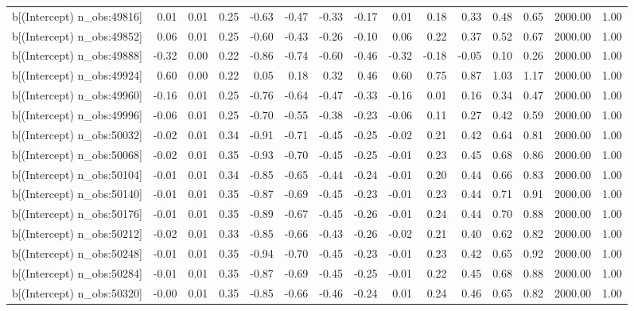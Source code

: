 \begin{table}[ht]
\begin{tabular}{rrrrrrrrrrrrrrr}
  b[(Intercept) n\_obs:49816] & 0.01 & 0.01 & 0.25 & -0.63 & -0.47 & -0.33 & -0.17 & 0.01 & 0.18 & 0.33 & 0.48 & 0.65 & 2000.00 & 1.00 \\ 
  b[(Intercept) n\_obs:49852] & 0.06 & 0.01 & 0.25 & -0.60 & -0.43 & -0.26 & -0.10 & 0.06 & 0.22 & 0.37 & 0.52 & 0.67 & 2000.00 & 1.00 \\ 
  b[(Intercept) n\_obs:49888] & -0.32 & 0.00 & 0.22 & -0.86 & -0.74 & -0.60 & -0.46 & -0.32 & -0.18 & -0.05 & 0.10 & 0.26 & 2000.00 & 1.00 \\ 
  b[(Intercept) n\_obs:49924] & 0.60 & 0.00 & 0.22 & 0.05 & 0.18 & 0.32 & 0.46 & 0.60 & 0.75 & 0.87 & 1.03 & 1.17 & 2000.00 & 1.00 \\ 
  b[(Intercept) n\_obs:49960] & -0.16 & 0.01 & 0.25 & -0.76 & -0.64 & -0.47 & -0.33 & -0.16 & 0.01 & 0.16 & 0.34 & 0.47 & 2000.00 & 1.00 \\ 
  b[(Intercept) n\_obs:49996] & -0.06 & 0.01 & 0.25 & -0.70 & -0.55 & -0.38 & -0.23 & -0.06 & 0.11 & 0.27 & 0.42 & 0.59 & 2000.00 & 1.00 \\ 
  b[(Intercept) n\_obs:50032] & -0.02 & 0.01 & 0.34 & -0.91 & -0.71 & -0.45 & -0.25 & -0.02 & 0.21 & 0.42 & 0.64 & 0.81 & 2000.00 & 1.00 \\ 
  b[(Intercept) n\_obs:50068] & -0.02 & 0.01 & 0.35 & -0.93 & -0.70 & -0.45 & -0.25 & -0.01 & 0.23 & 0.45 & 0.68 & 0.86 & 2000.00 & 1.00 \\ 
  b[(Intercept) n\_obs:50104] & -0.01 & 0.01 & 0.34 & -0.85 & -0.65 & -0.44 & -0.24 & -0.01 & 0.20 & 0.44 & 0.66 & 0.83 & 2000.00 & 1.00 \\ 
  b[(Intercept) n\_obs:50140] & -0.01 & 0.01 & 0.35 & -0.87 & -0.69 & -0.45 & -0.23 & -0.01 & 0.23 & 0.44 & 0.71 & 0.91 & 2000.00 & 1.00 \\ 
  b[(Intercept) n\_obs:50176] & -0.01 & 0.01 & 0.35 & -0.89 & -0.67 & -0.45 & -0.26 & -0.01 & 0.24 & 0.44 & 0.70 & 0.88 & 2000.00 & 1.00 \\ 
  b[(Intercept) n\_obs:50212] & -0.02 & 0.01 & 0.33 & -0.85 & -0.66 & -0.43 & -0.26 & -0.02 & 0.21 & 0.40 & 0.62 & 0.82 & 2000.00 & 1.00 \\ 
  b[(Intercept) n\_obs:50248] & -0.01 & 0.01 & 0.35 & -0.94 & -0.70 & -0.45 & -0.23 & -0.01 & 0.23 & 0.42 & 0.65 & 0.92 & 2000.00 & 1.00 \\ 
  b[(Intercept) n\_obs:50284] & -0.01 & 0.01 & 0.35 & -0.87 & -0.69 & -0.45 & -0.25 & -0.01 & 0.22 & 0.45 & 0.68 & 0.88 & 2000.00 & 1.00 \\ 
  b[(Intercept) n\_obs:50320] & -0.00 & 0.01 & 0.35 & -0.85 & -0.66 & -0.46 & -0.24 & 0.01 & 0.24 & 0.46 & 0.65 & 0.82 & 2000.00 & 1.00 \\ 

\end{tabular}
\end{table}

